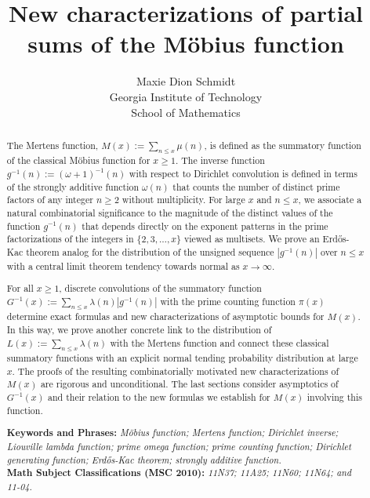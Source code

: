 \documentclass[11pt,reqno,a4letter]{article}
\title{
       \LARGE{
       New characterizations of partial sums of the M\"obius function 
       } 
}
\author{{\Large Maxie Dion Schmidt} \\ 
        {\normalsize Georgia Institute of Technology} \\[0.025cm] 
        {\normalsize School of Mathematics} 
}
\numberwithin{figure}{section}
\numberwithin{table}{section}
\theoremstyle{plain}
\numberwithin{theorem}{section}
\theoremstyle{definition}
\begin{document}
 

\maketitle

\begin{abstract} 
The Mertens function, $M(x) := \sum_{n \leq x} \mu(n)$, is 
defined as the summatory function of the classical M\"obius function for $x \geq 1$. 
The inverse function $g^{-1}(n) := (\omega+1)^{-1}(n)$
with respect to Dirichlet convolution is defined in terms of the 
strongly additive function $\omega(n)$ that counts the 
number of distinct prime factors of any integer $n \geq 2$ without multiplicity. 
For large $x$ and $n \leq x$, we associate a natural combinatorial 
significance to the magnitude of the distinct values of the 
function $g^{-1}(n)$ that depends directly on the exponent patterns in the 
prime factorizations of the integers in $\{2,3,\ldots,x\}$ viewed as multisets. 
We prove an Erd\H{o}s-Kac theorem analog for the distribution of the 
unsigned sequence $|g^{-1}(n)|$ over $n \leq x$ with a central limit theorem 
tendency towards normal as $x \rightarrow \infty$. 

For all $x \geq 1$, discrete convolutions of the summatory function 
$G^{-1}(x) := \sum_{n \leq x} \lambda(n) |g^{-1}(n)|$ with 
the prime counting function $\pi(x)$ determine 
exact formulas and new characterizations of asymptotic bounds for $M(x)$. 
In this way, we prove another concrete link to the distribution of  
$L(x) := \sum_{n \leq x} \lambda(n)$ with the Mertens function and connect these classical 
summatory functions with an explicit normal tending 
probability distribution at large $x$. 
The proofs of the resulting combinatorially motivated new characterizations of $M(x)$ 
are rigorous and unconditional. 
The last sections consider asymptotics of $G^{-1}(x)$ and 
their relation to the new formulas we establish for $M(x)$ involving this function. 

\bigskip 
\noindent
\textbf{Keywords and Phrases:} {\it M\"obius function; Mertens function; 
                                    Dirichlet inverse; Liouville lambda function; prime omega function; 
                                    prime counting function; Dirichlet generating function; 
                                    Erd\H{o}s-Kac theorem; strongly additive function. } \\ 
\textbf{Math Subject Classifications (MSC 2010):} {\it 11N37; 11A25; 11N60; 11N64; and 11-04. } 
\end{abstract} 
\end{document}
